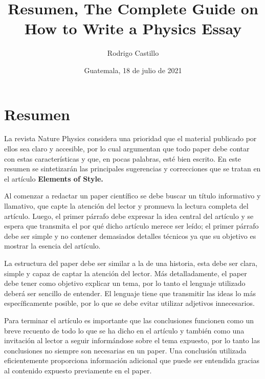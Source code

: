 \documentclass[11pt]{article}
\title{Resumen, The Complete Guide on How to Write a Physics Essay}
\author{Rodrigo Castillo}
\date{Guatemala, 18 de julio de 2021}
\begin{document}
\maketitle


\section{Resumen}
La revista Nature Physics considera una prioridad que el material publicado por ellos sea claro y accesible, por lo cual argumentan que todo paper debe contar con estas características y que, en pocas palabras, esté bien escrito. En este resumen se sintetizarán las principales sugerencias y correcciones que se tratan en el artículo \textbf{Elements of Style.}

Al comenzar a redactar un paper científico se debe buscar un título informativo y llamativo, que capte la atención del lector y promueva la lectura completa del artículo. Luego, el primer párrafo debe expresar la idea central del artículo y se espera que transmita el por qué dicho artículo merece ser leído; el primer párrafo debe ser simple y no contener demasiados detalles técnicos ya que su objetivo es mostrar la esencia del artículo.

La estructura del paper debe ser similar a la de una historia, esta debe ser clara, simple y capaz de captar la atención del lector. Más detalladamente, el paper debe tener como objetivo explicar un tema, por lo tanto el lenguaje utilizado deberá ser sencillo de entender. El lenguaje tiene que transmitir las ideas lo más específicamente posible, por lo que se debe evitar utilizar adjetivos innecesarios.

Para terminar el artículo es importante que las conclusiones funcionen como un breve recuento de todo lo que se ha dicho en el artículo y también como una invitación al lector a seguir informándose sobre el tema expuesto, por lo tanto las conclusiones no siempre son necesarias en un paper. Una conclusión utilizada eficientemente proporciona información adicional que puede ser entendida gracias al contenido expuesto previamente en el paper.
\end{document}
